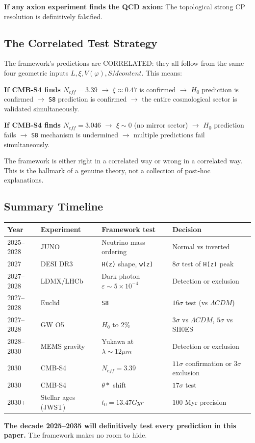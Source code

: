 \documentclass[aps,prd,preprint,superscriptaddress,longbibliography]{revtex4-2}
\begin{document}
\textbf{If any axion experiment finds the QCD axion:} The topological strong CP resolution is definitively falsified.



\subsection{The Correlated Test Strategy}

The framework's predictions are CORRELATED: they all follow from the same four geometric inputs ${L, \xi, V(\varphi), SM content}$. This means:

\textbf{If CMB-S4 finds $N_{eff} = 3.39$} $\to$ $\xi \approx 0.47$ is confirmed $\to$ $H_{0}$ prediction is confirmed $\to$ \texttt{S8} prediction is confirmed $\to$ the entire cosmological sector is validated simultaneously.

\textbf{If CMB-S4 finds $N_{eff} = 3.046$} $\to$ $\xi \sim  0$ (no mirror sector) $\to$ $H_{0}$ prediction fails $\to$ \texttt{S8} mechanism is undermined $\to$ multiple predictions fail simultaneously.

The framework is either right in a correlated way or wrong in a correlated way. This is the hallmark of a genuine theory, not a collection of post-hoc explanations.



\subsection{Summary Timeline}


\begin{table}[H]
\begin{ruledtabular}
\begin{tabular}{p{3.8cm}p{3.8cm}p{3.8cm}p{3.8cm}}
Year & Experiment & Framework test & Decision \\
\hline
2025--2028 & JUNO & Neutrino mass ordering & Normal vs inverted \\
2027 & DESI DR3 & \texttt{H(z)} shape, \texttt{w(z)} & $8\sigma$ test of \texttt{H(z)} peak \\
2027--2028 & LDMX/LHCb & Dark photon $\varepsilon \sim  5\times10^{-4}$ & Detection or exclusion \\
2027--2028 & Euclid & \texttt{S8} & $16\sigma$ test (vs $\Lambda CDM$) \\
2027--2028 & GW O5 & $H_{0}$ to 2\% & $3\sigma$ vs $\Lambda CDM$, $5\sigma$ vs SH0ES \\
2028--2030 & MEMS gravity & Yukawa at $\lambda\sim 12 \mu m$ & Detection or exclusion \\
2030 & CMB-S4 & $N_{eff} = 3.39$ & $11\sigma$ confirmation or $3\sigma$ exclusion \\
2030 & CMB-S4 & $\theta*$ shift & $17\sigma$ test \\
2030+ & Stellar ages (JWST) & $t_{0} = 13.47 Gyr$ & 100 Myr precision \\
\end{tabular}
\end{ruledtabular}
\end{table}

\textbf{The decade 2025--2035 will definitively test every prediction in this paper.} The framework makes no room to hide.



\end{document}
